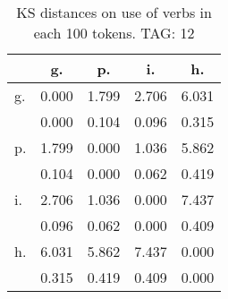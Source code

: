 \begin{table}[h!]
\begin{center}
\begin{tabular}{| l | c | c | c | c |}\hline
 & g. & p. & i. & h. \\\hline
g. & 0.000  & 1.799  & 2.706  & 6.031 \\\hline
 & 0.000  & 0.104  & 0.096  & 0.315 \\\hline
p. & 1.799  & 0.000  & 1.036  & 5.862 \\\hline
 & 0.104  & 0.000  & 0.062  & 0.419 \\\hline
i. & 2.706  & 1.036  & 0.000  & 7.437 \\\hline
 & 0.096  & 0.062  & 0.000  & 0.409 \\\hline
h. & 6.031  & 5.862  & 7.437  & 0.000 \\\hline
 & 0.315  & 0.419  & 0.409  & 0.000 \\\hline
\end{tabular}
\caption{KS distances on use of verbs in each 100 tokens. TAG: 12}
\end{center}
\end{table}